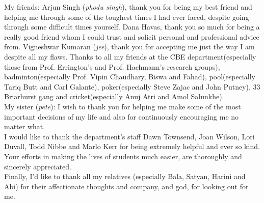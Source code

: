 \noindent My friends: Arjun Singh (\emph{phodu singh}), thank you for being my best friend and helping me through some of the toughest times I had ever faced, despite going through some difficult times yourself. Dana Havas, thank you so much for being a really good friend whom I could trust and solicit personal and professional advice from. Vigneshwar Kumaran (\emph{jee}), thank you for accepting me just the way I am despite all my flaws. Thanks to all my friends at the CBE department(especially those from Prof. Errington's and Prof. Hachmann's research groups), badminton(especially Prof. Vipin Chaudhary, Biswa and Fahad), pool(especially Tariq Butt and Carl Galante), poker(especially Steve Zajac and John Putney), 33 Briarhurst gang and cricket(especially Anuj Atri and Amol Salunkhe).\\

\noindent My sister (\emph{pete}): I wish to thank you for helping me make some of the most important decisions of my life and also for continuously encouraging me no matter what.\\

\noindent I would like to thank the department's staff Dawn Townsend, Joan Wilson, Lori Duvall, Todd Nibbe and Marlo Kerr for being extremely helpful and ever so kind. Your efforts in making the lives of students much easier, are thoroughly and sincerely appreciated.\\

\noindent Finally, I'd like to thank all my relatives (especially Bala, Satyan, Harini and Abi) for their affectionate thoughts and company, and god, for looking out for me.
